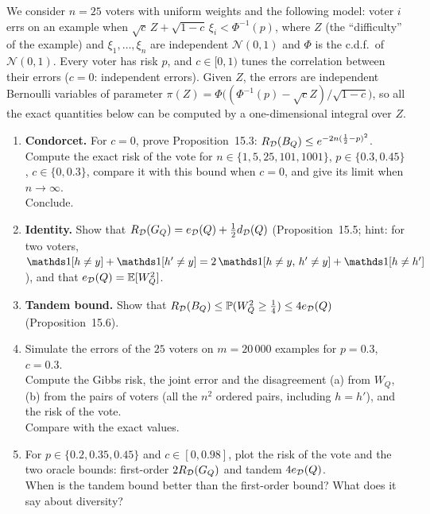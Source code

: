 \documentclass[a4paper,11pt]{article}
\begin{document}
\label{p5:second}

We consider $n=25$ voters with uniform weights and the following model: voter $i$ errs on an example when
$\sqrt c\,Z+\sqrt{1-c}\,\xi_i<\Phi^{-1}(p)$, where $Z$ (the ``difficulty'' of the example) and $\xi_1,\dots,\xi_n$ are
independent $\mathcal N(0,1)$ and $\Phi$ is the c.d.f.\ of $\mathcal N(0,1)$. Every voter has risk $p$, and $c\in[0,1)$
tunes the correlation between their errors ($c=0$: independent errors). Given $Z$, the errors are independent Bernoulli
variables of parameter $\pi(Z)=\Phi\big((\Phi^{-1}(p)-\sqrt cZ)/\sqrt{1-c}\big)$, so all the exact quantities below can be
computed by a one-dimensional integral over $Z$.

\begin{enumerate}
\item \textbf{Condorcet.} For $c=0$, prove Proposition~15.3: $R_{\mathcal{D}}(B_{Q})\leq e^{-2n(\frac12-p)^2}$.\\
      Compute the exact risk of the vote for $n\in\{1,5,25,101,1001\}$, $p\in\{0.3,0.45\}$, $c\in\{0,0.3\}$, compare it
      with this bound when $c=0$, and give its limit when $n\to\infty$.\\
      Conclude.
\item \textbf{Identity.} Show that $R_{\mathcal{D}}(G_{Q})=e_{\mathcal{D}}(Q)+\frac12d_{\mathcal{D}}(Q)$ (Proposition~15.5; hint: for two voters,
      $\ind{h\neq y}+\ind{h'\neq y}=2\,\ind{h\neq y,\,h'\neq y}+\ind{h\neq h'}$), and that $e_{\mathcal{D}}(Q)=\mathbb{E}[W_Q^2]$.
\item \textbf{Tandem bound.} Show that $R_{\mathcal{D}}(B_{Q})\leq\mathbb{P}(W_Q^2\geq\frac14)\leq4e_{\mathcal{D}}(Q)$ (Proposition~15.6).
\item Simulate the errors of the $25$ voters on $m=20\,000$ examples for $p=0.3$, $c=0.3$.\\
      Compute the Gibbs risk, the joint error and the disagreement (a) from $W_Q$, (b) from the pairs of voters (all the
      $n^2$ ordered pairs, including $h=h'$), and the risk of the vote.\\
      Compare with the exact values.
\item For $p\in\{0.2,0.35,0.45\}$ and $c\in[0,0.98]$, plot the risk of the vote and the two oracle bounds:
      first-order $2R_{\mathcal{D}}(G_{Q})$ and tandem $4e_{\mathcal{D}}(Q)$.\\
      When is the tandem bound better than the first-order bound? What does it say about diversity?
\end{enumerate}
\end{document}
